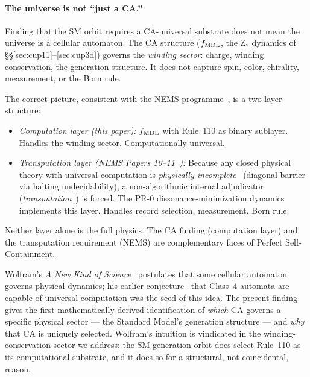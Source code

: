 \documentclass[11pt]{article}
\theoremstyle{remark}
\begin{document}
\paragraph{The universe is not ``just a CA.''}
Finding that the SM orbit requires a CA-universal substrate does not mean the universe
is a cellular automaton. The CA structure ($f_{\rm MDL}$, the Z$_7$ dynamics of
\S\S\ref{sec:cup11}--\ref{sec:cup3d}) governs the \emph{winding sector}: charge, winding
conservation, the generation structure. It does not capture spin, color, chirality,
measurement, or the Born rule.

The correct picture, consistent with the NEMS programme~\cite{SpivackUGP2024},
is a two-layer structure:
\begin{itemize}
\item \emph{Computation layer (this paper):} $f_{\rm MDL}$ with Rule~110 as binary sublayer.
  Handles the winding sector. Computationally universal.
\item \emph{Transputation layer (NEMS Papers 10--11~\cite{SpivackUGP2024}):} Because any closed physical theory
  with universal computation is \emph{physically incomplete}~\cite{SpivackUGP2024} (diagonal
  barrier via halting undecidability), a non-algorithmic internal adjudicator
  (\emph{transputation}~\cite{SpivackUGP2025}) is forced. The PR-0 dissonance-minimization
  dynamics implements this layer. Handles record selection, measurement, Born rule.
\end{itemize}
Neither layer alone is the full physics. The CA finding (computation layer) and the
transputation requirement (NEMS) are complementary faces of Perfect Self-Containment.

Wolfram's \emph{A New Kind of Science}~\cite{Wolfram2002} postulates that some cellular
automaton governs physical dynamics; his earlier conjecture~\cite{Wolfram1984} that Class~4
automata are capable of universal computation was the seed of this idea. The present finding gives the first mathematically
derived identification of \emph{which} CA governs a specific physical sector --- the
Standard Model's generation structure --- and \emph{why} that CA is uniquely selected.
Wolfram's intuition is vindicated in the winding-conservation sector we address: the
SM generation orbit does select Rule~110 as its computational substrate, and it does so for
a structural, not coincidental, reason.
\end{document}
